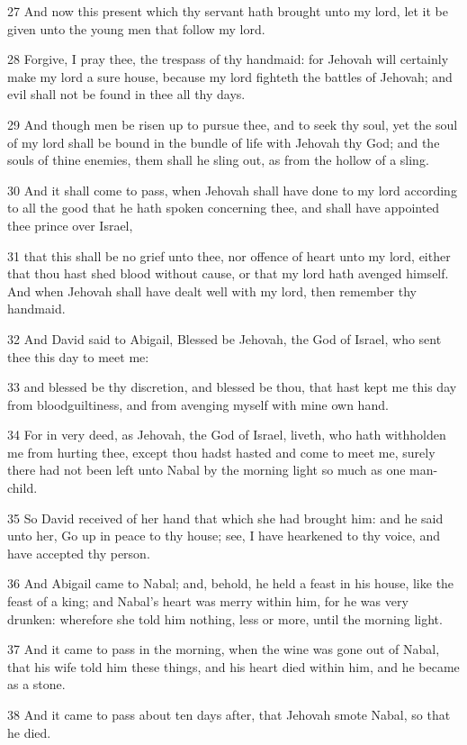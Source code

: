 \par 27 And now this present which thy servant hath brought unto my lord, let it be given unto the young men that follow my lord.
\par 28 Forgive, I pray thee, the trespass of thy handmaid: for Jehovah will certainly make my lord a sure house, because my lord fighteth the battles of Jehovah; and evil shall not be found in thee all thy days.
\par 29 And though men be risen up to pursue thee, and to seek thy soul, yet the soul of my lord shall be bound in the bundle of life with Jehovah thy God; and the souls of thine enemies, them shall he sling out, as from the hollow of a sling.
\par 30 And it shall come to pass, when Jehovah shall have done to my lord according to all the good that he hath spoken concerning thee, and shall have appointed thee prince over Israel,
\par 31 that this shall be no grief unto thee, nor offence of heart unto my lord, either that thou hast shed blood without cause, or that my lord hath avenged himself. And when Jehovah shall have dealt well with my lord, then remember thy handmaid.
\par 32 And David said to Abigail, Blessed be Jehovah, the God of Israel, who sent thee this day to meet me:
\par 33 and blessed be thy discretion, and blessed be thou, that hast kept me this day from bloodguiltiness, and from avenging myself with mine own hand.
\par 34 For in very deed, as Jehovah, the God of Israel, liveth, who hath withholden me from hurting thee, except thou hadst hasted and come to meet me, surely there had not been left unto Nabal by the morning light so much as one man-child.
\par 35 So David received of her hand that which she had brought him: and he said unto her, Go up in peace to thy house; see, I have hearkened to thy voice, and have accepted thy person.
\par 36 And Abigail came to Nabal; and, behold, he held a feast in his house, like the feast of a king; and Nabal's heart was merry within him, for he was very drunken: wherefore she told him nothing, less or more, until the morning light.
\par 37 And it came to pass in the morning, when the wine was gone out of Nabal, that his wife told him these things, and his heart died within him, and he became as a stone.
\par 38 And it came to pass about ten days after, that Jehovah smote Nabal, so that he died.

